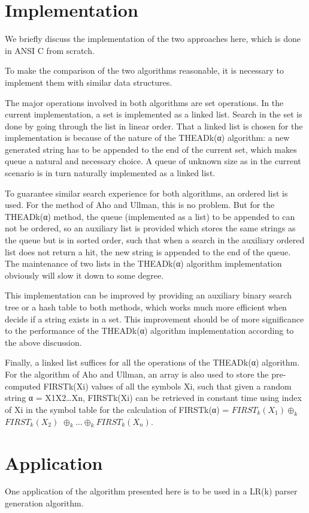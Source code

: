 \documentclass{sig-alternate-05-2015}
\begin{document}
\section{Implementation}
We briefly discuss the implementation of the two approaches
here, which is done in ANSI C from scratch.

To make the comparison of the two algorithms reasonable,
it is necessary to implement them with similar data
structures.

The major operations involved in both algorithms are set
operations. In the current implementation, a set is implemented
as a linked list. Search in the set is done by going
through the list in linear order. That a linked list is chosen
for the implementation is because of the nature of the
THEADk(α) algorithm: a new generated string has to be
appended to the end of the current set, which makes queue
a natural and necessary choice. A queue of unknown size as
in the current scenario is in turn naturally implemented as a
linked list.

To guarantee similar search experience for both algorithms,
an ordered list is used. For the method of Aho and
Ullman, this is no problem. But for the THEADk(α) method,
the queue (implemented as a list) to be appended to can
not be ordered, so an auxiliary list is provided which stores
the same strings as the queue but is in sorted order, such
that when a search in the auxiliary ordered list does not
return a hit, the new string is appended to the end of the
queue. The maintenance of two lists in the THEADk(α)
algorithm implementation obviously will slow it down to
some degree.

This implementation can be improved by providing an
auxiliary binary search tree or a hash table to both methods,
which works much more efficient when decide if a string
exists in a set. This improvement should be of more significance
to the performance of the THEADk(α) algorithm
implementation according to the above discussion.

Finally, a linked list suffices for all the operations of the
THEADk(α) algorithm. For the algorithm of Aho and
Ullman, an array is also used to store the pre-computed
FIRSTk(Xi) values of all the symbols Xi, such that given a
random string α = X1X2…Xn, FIRSTk(Xi) can be retrieved
in constant time using index of Xi in the symbol table for
the calculation of FIRSTk(α) = $FIRST_k(X_1)\oplus_k$
$FIRST_k(X_2)$ $\oplus_k …\oplus_k FIRST_k(X_n)$.

\section{Application}
One application of the algorithm presented here is to be
used in a LR(k) parser generation algorithm.
\end{document}
